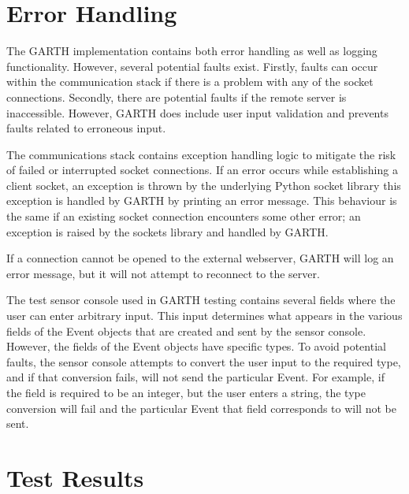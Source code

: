 \documentclass{article}
\begin{document}
\section{Error Handling}

The GARTH implementation contains both error handling as well as
logging functionality. However, several potential faults
exist. Firstly, faults can occur within the communication stack if
there is a problem with any of the socket connections. Secondly, there
are potential faults if the remote server is inaccessible. However,
GARTH does include user input validation and prevents faults related
to erroneous input.

The communications stack contains exception handling logic to mitigate
the risk of failed or interrupted socket connections. If an error
occurs while establishing a client socket, an exception is thrown by
the underlying Python socket library this exception is handled by
GARTH by printing an error message. This behaviour is the same if an
existing socket connection encounters some other error; an exception
is raised by the sockets library and handled by GARTH.

If a connection cannot be opened to the external webserver, GARTH will
log an error message, but it will not attempt to reconnect to the
server.

The test sensor console used in GARTH testing contains several fields
where the user can enter arbitrary input. This input determines what
appears in the various fields of the Event objects that are created
and sent by the sensor console. However, the fields of the Event
objects have specific types. To avoid potential faults, the sensor
console attempts to convert the user input to the required type, and
if that conversion fails, will not send the particular Event. For
example, if the field is required to be an integer, but the user
enters a string, the type conversion will fail and the particular
Event that field corresponds to will not be sent.

\section{Test Results}
\end{document}
